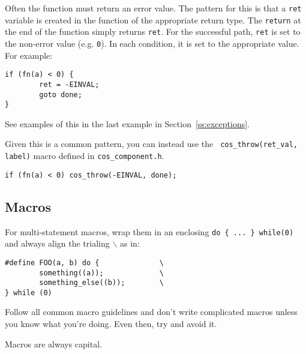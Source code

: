 \documentclass[11pt,onecolumn]{article}
\begin{document}
Often the function must return an error value.  The pattern for this
is that a {\tt ret} variable is created in the function of the
appropriate return type.  The {\tt return} at the end of the function
simply returns {\tt ret}.  For the successful path, {\tt ret} is set
to the non-error value (e.g. {\tt 0}).  In each condition, it is set
to the appropriate value.  For example:

    \begin{minipage}{3in}
      \footnotesize
      \lstset{language=C}
      \begin{lstlisting}
if (fn(a) < 0) {
        ret = -EINVAL;
        goto done;
}
      \end{lstlisting}
    \end{minipage}

See examples of this in the last example in
Section~\ref{ss:exceptions}.

Given this is a common pattern, you can instead use the {\tt
  cos\_throw(ret\_val, label)} macro defined in {\tt cos\_component.h}.

    \begin{minipage}{3in}
      \footnotesize
      \lstset{language=C}
      \begin{lstlisting}
if (fn(a) < 0) cos_throw(-EINVAL, done);
      \end{lstlisting}
    \end{minipage}

\subsection{Macros}

For multi-statement macros, wrap them in an enclosing {\tt do \{ ... \}
  while(0)} and always align the trialing {\tt $\backslash$} as in:

    \begin{minipage}{3in}
      \footnotesize
      \lstset{language=C}
      \begin{lstlisting}
#define FOO(a, b) do {              \
        something((a));             \
        something_else((b));        \
} while (0)
      \end{lstlisting}
    \end{minipage}

Follow all common macro guidelines and don't write complicated macros
unless you know what you're doing.  Even then, try and avoid it.

Macros are always capital.
\end{document}
